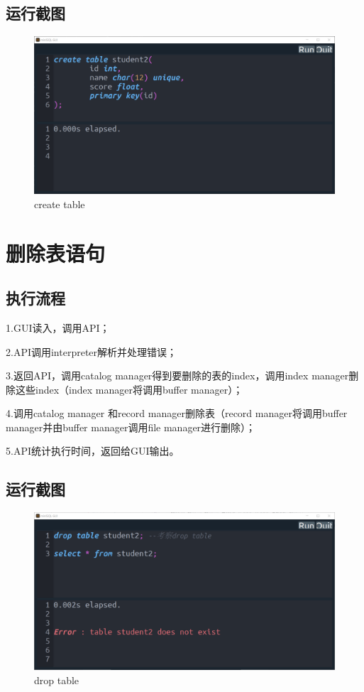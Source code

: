 \documentclass[UTF8]{ctexrep} %
\begin{document}
\subsection{运行截图}
\begin{figure}[H]
    \centering
    \includegraphics[width=0.8\linewidth]{figure/1.1.png}
    \caption{create table}
    \label{fig:runtime1.1}
\end{figure}
\section{删除表语句}
\subsection{执行流程}
1.GUI读入，调用API；
\par
2.API调用interpreter解析并处理错误；
\par
3.返回API，调用catalog manager得到要删除的表的index，调用index manager删除这些index（index manager将调用buffer manager）；
\par
4.调用catalog manager 和record manager删除表（record manager将调用buffer manager并由buffer manager调用file manager进行删除）；
\par
5.API统计执行时间，返回给GUI输出。
\subsection{运行截图}
\begin{figure}[H]
    \centering
    \includegraphics[width=0.8\linewidth]{figure/2.1.png}
    \caption{drop table}
    \label{fig:runtime2.1}
\end{figure}
\end{document}
